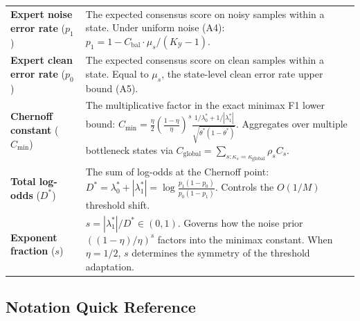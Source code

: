 \documentclass{article}
\begin{document}
\begin{longtable}{p{} p{}}
\textbf{Expert noise error rate} ($p_1$) & The expected consensus score on noisy samples within a state. Under uniform noise (A4): $p_1 = 1 - C_{\text{bal}}\cdot \mu_s/(K_{\mathcal{Y}}-1)$. \\

\textbf{Expert clean error rate} ($p_0$) & The expected consensus score on clean samples within a state. Equal to $\mu_s$, the state-level clean error rate upper bound (A5). \\

\textbf{Chernoff constant} ($C_{\min}$) & The multiplicative factor in the exact minimax F1 lower bound: $C_{\min} = \frac{\eta}{2}(\frac{1-\eta}{\eta})^s \frac{1/\lambda_0^* + 1/|\lambda_1^*|}{\sqrt{\theta^*(1-\theta^*)}}$. Aggregates over multiple bottleneck states via $C_{\text{global}} = \sum_{s: \kappa_s = \kappa_{\text{global}}} \rho_s C_s$. \\

\textbf{Total log-odds} ($D^*$) & The sum of log-odds at the Chernoff point: $D^* = \lambda_0^* + |\lambda_1^*| = \log\frac{p_1(1-p_0)}{p_0(1-p_1)}$. Controls the $O(1/M)$ threshold shift. \\

\textbf{Exponent fraction} ($s$) & $s = |\lambda_1^*|/D^* \in (0,1)$. Governs how the noise prior $((1-\eta)/\eta)^s$ factors into the minimax constant. When $\eta = 1/2$, $s$ determines the symmetry of the threshold adaptation. \\

\end{longtable}

\subsection{Notation Quick Reference}
\end{document}
